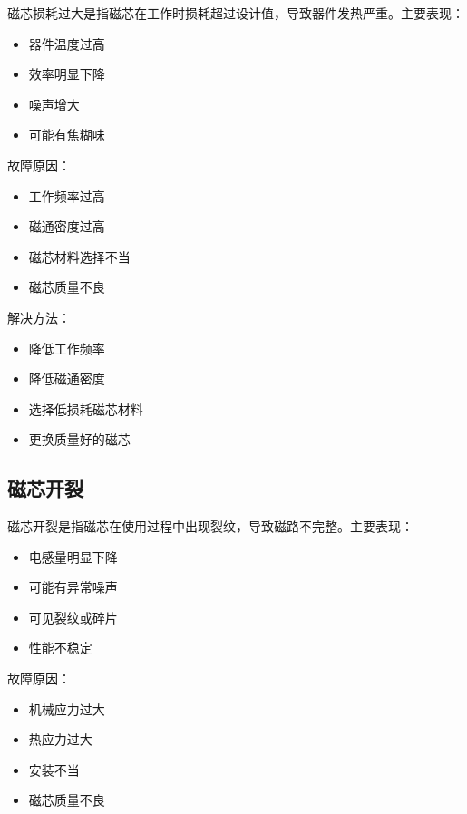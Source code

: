 \documentclass[12pt,UTF8]{ctexbook}
\begin{document}
磁芯损耗过大是指磁芯在工作时损耗超过设计值，导致器件发热严重。主要表现：

\begin{itemize}[leftmargin=2cm]
    \item 器件温度过高
    \item 效率明显下降
    \item 噪声增大
    \item 可能有焦糊味
\end{itemize}

故障原因：

\begin{itemize}[leftmargin=2cm]
    \item 工作频率过高
    \item 磁通密度过高
    \item 磁芯材料选择不当
    \item 磁芯质量不良
\end{itemize}

解决方法：

\begin{itemize}[leftmargin=2cm]
    \item 降低工作频率
    \item 降低磁通密度
    \item 选择低损耗磁芯材料
    \item 更换质量好的磁芯
\end{itemize}

\subsection{磁芯开裂}

磁芯开裂是指磁芯在使用过程中出现裂纹，导致磁路不完整。主要表现：

\begin{itemize}[leftmargin=2cm]
    \item 电感量明显下降
    \item 可能有异常噪声
    \item 可见裂纹或碎片
    \item 性能不稳定
\end{itemize}

故障原因：

\begin{itemize}[leftmargin=2cm]
    \item 机械应力过大
    \item 热应力过大
    \item 安装不当
    \item 磁芯质量不良
\end{itemize}
\end{document}
